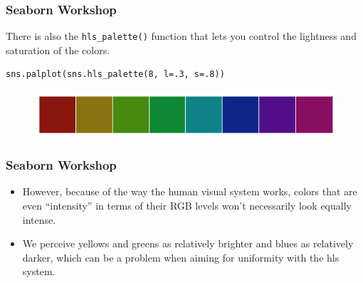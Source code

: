 \documentclass{beamer}
\begin{document}
\begin{frame}[fragile]
	\frametitle{Seaborn Workshop}
	\large
There is also the \texttt{hls\_palette()} function that lets you control the lightness and saturation of the colors.
\begin{verbatim}
sns.palplot(sns.hls_palette(8, l=.3, s=.8))
\end{verbatim}
\begin{figure}
\centering
\includegraphics[width=0.7\linewidth]{images/color_palettes_12_0}
\end{figure}

\end{frame}
\begin{frame}[fragile]
\frametitle{Seaborn Workshop}
\large
\begin{itemize}
\item However, because of the way the human visual system works, colors that are even “intensity” in terms of their RGB levels won’t necessarily look equally intense.
\item  We perceive yellows and greens as relatively brighter and blues as relatively darker, which can be a problem when aiming for uniformity with the hls system.
\end{itemize}

\end{frame}
\end{document}
